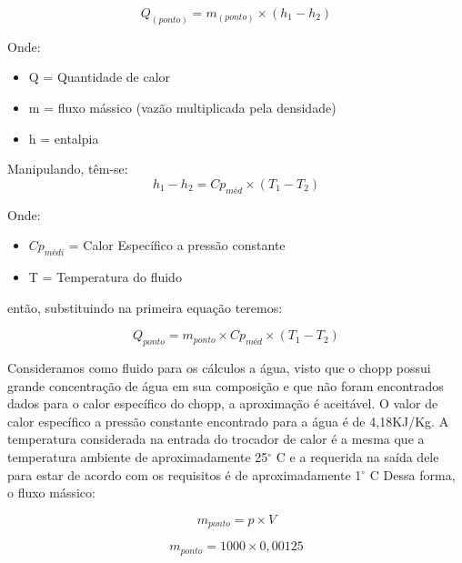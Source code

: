             \begin{equation}
                Q_{(ponto)} = m_{(ponto)} \times (h_1 - h_2)
            \end{equation}

            Onde:
            \begin{itemize}
                \item Q = Quantidade de calor
                \item m = fluxo mássico (vazão multiplicada pela densidade)
                \item h = entalpia
            \end{itemize}

            Manipulando, têm-se:
            \begin{equation}
                h_1 - h_2 = Cp_{méd} \times (T_1 - T_2)
            \end{equation}

            Onde:
            \begin{itemize}
                \item $Cp_{médi}$ = Calor Específico a pressão constante
                \item T = Temperatura do fluido
            \end{itemize}
            então, substituindo na primeira equação teremos:
            
            \begin{equation}
                Q_{ponto} = m_{ponto} \times Cp_{méd} \times (T_1 - T_2)
            \end{equation}

            Consideramos como fluido para os cálculos a água, visto que o chopp possui
            grande concentração de água em sua composição e que não foram encontrados dados
            para o calor específico do chopp, a aproximação é aceitável. O valor de calor
            específico a pressão constante encontrado para a água é de 4,18KJ/Kg. A temperatura
            considerada na entrada do trocador de calor é a mesma que a temperatura ambiente
            de aproximadamente  25$^\circ$ C e a requerida na saída dele para estar de acordo com os
            requisitos é de aproximadamente 1$^\circ$ C Dessa forma, o fluxo mássico:

            \begin{equation}
                m_{ponto} = p \times V
            \end{equation}

            \begin{equation}
                m_{ponto} = 1000 \times 0,00125
            \end{equation}

